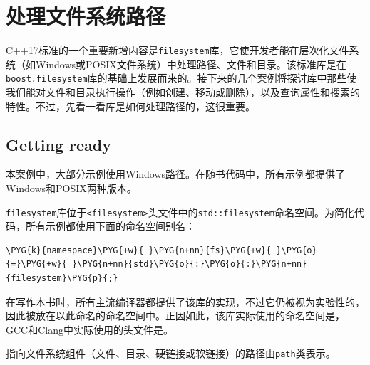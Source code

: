 \section{处理文件系统路径}



C++17标准的一个重要新增内容是\texttt{filesystem}库，它使开发者能在层次化文件系统（如Windows或POSIX文件系统）中处理路径、文件和目录。该标准库是在\texttt{boost.\allowbreak{}filesystem}库的基础上发展而来的。接下来的几个案例将探讨库中那些使我们能对文件和目录执行操作（例如创建、移动或删除），以及查询属性和搜索的特性。不过，先看一看库是如何处理路径的，这很重要。



\subsection{Getting ready}



本案例中，大部分示例使用Windows路径。在随书代码中，所有示例都提供了Windows和POSIX两种版本。



\texttt{filesystem}库位于\texttt{<\allowbreak{}filesystem>}头文件中的\texttt{std::\allowbreak{}filesystem}命名空间。为简化代码，所有示例都使用下面的命名空间别名：



\begin{codeblockbg}
\begin{Verbatim}[commandchars=\\\{\},breaklines=true,breakanywhere=true,fontsize=\codefont,xleftmargin=17bp]
\PYG{k}{namespace}\PYG{+w}{ }\PYG{n+nn}{fs}\PYG{+w}{ }\PYG{o}{=}\PYG{+w}{ }\PYG{n+nn}{std}\PYG{o}{:}\PYG{o}{:}\PYG{n+nn}{filesystem}\PYG{p}{;}
\end{Verbatim}
\end{codeblockbg}



\begin{myNote}
在写作本书时，所有主流编译器都提供了该库的实现，不过它仍被视为实验性的，因此被放在以此命名的命名空间中。正因如此，该库实际使用的命名空间是，GCC和Clang中实际使用的头文件是。
\end{myNote}



指向文件系统组件（文件、目录、硬链接或软链接）的路径由\texttt{path}类表示。


